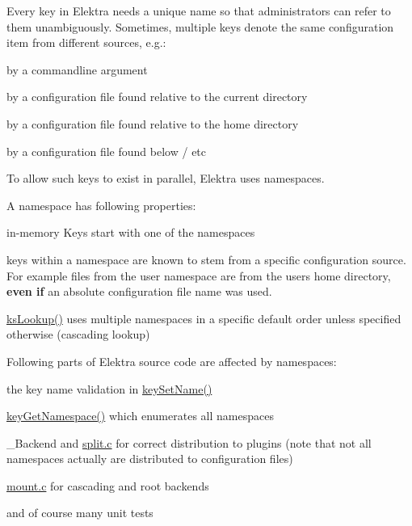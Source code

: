 Every key in Elektra needs a unique name so that administrators can refer to them unambiguously. Sometimes, multiple keys denote the same configuration item from different sources, e.\+g.\+:


\begin{DoxyItemize}
\item by a commandline argument
\item by a configuration file found relative to the current directory
\item by a configuration file found relative to the home directory
\item by a configuration file found below {\ttfamily /} etc
\end{DoxyItemize}

To allow such keys to exist in parallel, Elektra uses namespaces.

A namespace has following properties\+:


\begin{DoxyItemize}
\item in-\/memory Keys start with one of the namespaces
\item keys within a namespace are known to stem from a specific configuration source. For example files from the {\ttfamily user} namespace are from the users home directory, {\bfseries even if} an absolute configuration file name was used.
\item {\ttfamily \hyperlink{group__keyset_ga60f1ddcf23272f2b29b90e92ebe9b56f}{ks\+Lookup()}} uses multiple namespaces in a specific default order unless specified otherwise (cascading lookup)
\end{DoxyItemize}

Following parts of Elektra source code are affected by namespaces\+:


\begin{DoxyItemize}
\item the key name validation in {\ttfamily \hyperlink{group__keyname_ga7699091610e7f3f43d2949514a4b35d9}{key\+Set\+Name()}}
\item {\ttfamily \hyperlink{group__keyname_gafc3ca03ed10f87eb59bdc02cf2a0de8d}{key\+Get\+Namespace()}} which enumerates all namespaces
\item {\ttfamily \+\_\+\+Backend} and {\ttfamily \hyperlink{split_8c}{split.\+c}} for correct distribution to plugins (note that not all namespaces actually are distributed to configuration files)
\item {\ttfamily \hyperlink{mount_8c}{mount.\+c}} for cascading and root backends
\item and of course many unit tests
\end{DoxyItemize}

